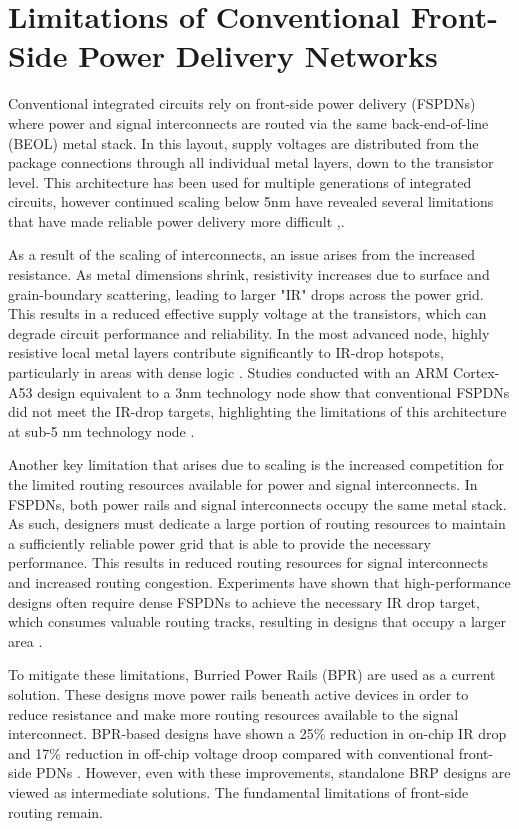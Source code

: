 \section{Limitations of Conventional Front-Side Power Delivery Networks}

Conventional integrated circuits rely on front-side power delivery (FSPDNs) where power and signal interconnects are routed via the same back-end-of-line (BEOL) metal stack. In this layout, supply voltages are distributed from the package connections through all individual metal layers, down to the transistor level. This architecture has been used for multiple generations of integrated circuits, however continued scaling below 5nm have revealed several limitations that have made reliable power delivery more difficult \cite{9817394},\cite{10244504}. 

As a result of the scaling of interconnects, an issue arises from the increased resistance. As metal dimensions shrink, resistivity increases due to surface and grain-boundary scattering, leading to larger "IR" drops across the power grid\cite{8993617}. This results in a reduced effective supply voltage at the transistors, which can degrade circuit performance and reliability. In the most advanced node, highly resistive local metal layers contribute significantly to IR-drop hotspots, particularly in areas with dense logic \cite{8993617}. Studies conducted with an ARM Cortex-A53 design equivalent to a 3nm technology node show that conventional FSPDNs did not meet the IR-drop targets, highlighting the limitations of this architecture at sub-5 nm technology node \cite{9817394}.

Another key limitation that arises due to scaling is the increased competition for the limited routing resources available for power and signal interconnects. In FSPDNs, both power rails and signal interconnects occupy the same metal stack. As such, designers must dedicate a large portion of routing resources to maintain a sufficiently reliable power grid that is able to provide the necessary performance. This results in reduced routing resources for signal interconnects and increased routing congestion. Experiments have shown that high-performance designs often require dense FSPDNs to achieve the necessary IR drop target, which consumes valuable routing tracks, resulting in designs that occupy a larger area \cite{10631463}.

To mitigate these limitations, Burried Power Rails (BPR) are used as a current solution. These designs move power rails beneath active devices in order to reduce resistance and make more routing resources available to the signal interconnect. BPR-based designs have shown a 25\% reduction in on-chip IR drop and 17\% reduction in off-chip voltage droop compared with conventional front-side PDNs \cite{9817394}. However, even with these improvements, standalone BRP designs are viewed as intermediate solutions\cite{10244504}. The fundamental limitations of front-side routing remain.

